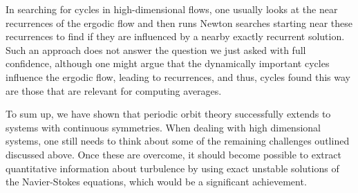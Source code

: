 In searching for cycles in high-dimensional flows, one usually looks at
the near recurrences of the ergodic flow and then runs Newton searches
starting near these recurrences to find if they are influenced by a nearby exactly
recurrent solution. Such an approach does not answer the question we just asked with full
confidence, although one might argue that the dynamically important cycles
influence the ergodic flow, leading to recurrences, and thus, cycles found this way are
those that are relevant for computing averages.

To sum up, we have shown that periodic orbit theory successfully extends to
systems with continuous symmetries. When dealing with high dimensional systems,
one still needs to think about some of the remaining challenges outlined discussed above. 
Once these are overcome, it should become possible to extract quantitative information about 
turbulence by using exact unstable solutions of the Navier-Stokes equations, which would 
be a significant achievement.
